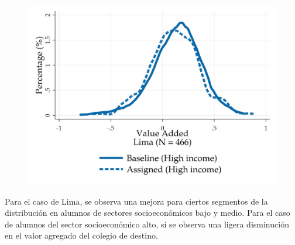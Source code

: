 \documentclass[11pt]{article}
\numberwithin{equation}{section}
\begin{document}
\begin{figure}[!htb]
\begin{minipage}[b]{0.99\textwidth}
            \includegraphics[width=\linewidth]{figures/LimaHI.jpeg}
            \label{fig:LimaHI}
        \endminipage
    \end{minipage}
\end{figure}

Para el caso de Lima, se observa una mejora para ciertos segmentos de la distribuci\'on en alumnos de sectores socioecon\'omicos bajo y medio. Para el caso de alumnos del sector socioecon\'omico alto, s\'i se observa una ligera disminuci\'on en el valor agregado del colegio de destino.  
\end{document}
